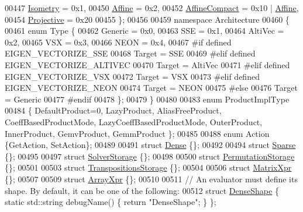 \begin{DoxyCode}
00447   \hyperlink{group__enums_ggaee59a86102f150923b0cac6d4ff05107a080cd5366173608f701cd945c2335568}{Isometry}      = 0x1,
00450   \hyperlink{group__enums_ggaee59a86102f150923b0cac6d4ff05107a71e768e0581725d919d0b05f4cb83234}{Affine}        = 0x2,
00452   \hyperlink{group__enums_ggaee59a86102f150923b0cac6d4ff05107aa30a06b60d218b709020972df47de2b0}{AffineCompact} = 0x10 | \hyperlink{group__enums_ggaee59a86102f150923b0cac6d4ff05107a71e768e0581725d919d0b05f4cb83234}{Affine},
00454   \hyperlink{group__enums_ggaee59a86102f150923b0cac6d4ff05107aead6a2de12a17aaa4f5c523215dfccad}{Projective}    = 0x20
00455 \};
00456 
00459 \textcolor{keyword}{namespace }Architecture
00460 \{
00461   \textcolor{keyword}{enum} Type \{
00462     Generic = 0x0,
00463     SSE = 0x1,
00464     AltiVec = 0x2,
00465     VSX = 0x3,
00466     NEON = 0x4,
00467 \textcolor{preprocessor}{#if defined EIGEN\_VECTORIZE\_SSE}
00468     Target = SSE
00469 \textcolor{preprocessor}{#elif defined EIGEN\_VECTORIZE\_ALTIVEC}
00470     Target = AltiVec
00471 \textcolor{preprocessor}{#elif defined EIGEN\_VECTORIZE\_VSX}
00472     Target = VSX
00473 \textcolor{preprocessor}{#elif defined EIGEN\_VECTORIZE\_NEON}
00474     Target = NEON
00475 \textcolor{preprocessor}{#else}
00476     Target = Generic
00477 \textcolor{preprocessor}{#endif}
00478   \};
00479 \}
00480 
00483 \textcolor{keyword}{enum} ProductImplType
00484 \{ DefaultProduct=0, LazyProduct, AliasFreeProduct, CoeffBasedProductMode, LazyCoeffBasedProductMode, 
      OuterProduct, InnerProduct, GemvProduct, GemmProduct \};
00485 
00488 \textcolor{keyword}{enum} Action \{GetAction, SetAction\};
00489 
00491 \textcolor{keyword}{struct }\hyperlink{struct_eigen_1_1_dense}{Dense} \{\};
00492 
00494 \textcolor{keyword}{struct }\hyperlink{struct_eigen_1_1_sparse}{Sparse} \{\};
00495 
00497 \textcolor{keyword}{struct }\hyperlink{struct_eigen_1_1_solver_storage}{SolverStorage} \{\};
00498 
00500 \textcolor{keyword}{struct }\hyperlink{struct_eigen_1_1_permutation_storage}{PermutationStorage} \{\};
00501 
00503 \textcolor{keyword}{struct }\hyperlink{struct_eigen_1_1_transpositions_storage}{TranspositionsStorage} \{\};
00504 
00506 \textcolor{keyword}{struct }\hyperlink{struct_eigen_1_1_matrix_xpr}{MatrixXpr} \{\};
00507 
00509 \textcolor{keyword}{struct }\hyperlink{struct_eigen_1_1_array_xpr}{ArrayXpr} \{\};
00510 
00511 \textcolor{comment}{// An evaluator must define its shape. By default, it can be one of the following:}
00512 \textcolor{keyword}{struct }\hyperlink{struct_eigen_1_1_dense_shape}{DenseShape}             \{ \textcolor{keyword}{static} std::string debugName() \{ \textcolor{keywordflow}{return} \textcolor{stringliteral}{"DenseShape"}; \} \};

\end{DoxyCode}
